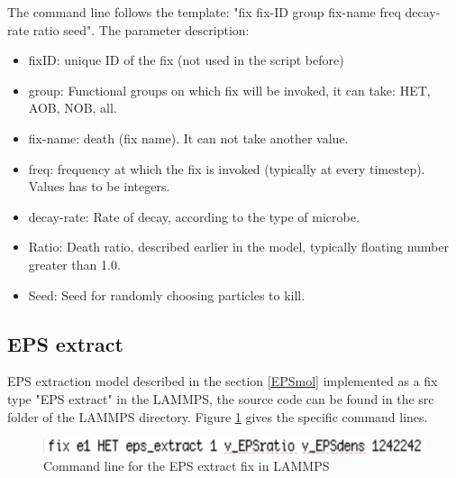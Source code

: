 \documentclass[11pt,a4paper,openright]{article}
\begin{document}
The command line follows the template: "fix fix-ID group fix-name freq decay-rate ratio seed". The parameter description:
\begin{itemize}
\item fixID: unique ID of the fix (not used in the script before)
\item group: Functional groups on which fix will be invoked, it can take: HET, AOB, NOB, all.
\item fix-name: death (fix name). It can not take another value.
\item freq: frequency at which the fix is invoked (typically at every timestep). Values has to be integers.
\item decay-rate: Rate of decay, according to the type of microbe.
\item Ratio: Death ratio, described earlier in the model, typically floating number greater than 1.0.
\item Seed: Seed for randomly choosing particles to kill. 
\end{itemize}

\subsection{EPS extract}
EPS extraction model described in the section \ref{EPSmol} implemented as a fix type "EPS extract" in the LAMMPS, the source code can be found in the src folder of the LAMMPS directory. Figure \ref{fig:EPS} gives the specific command lines.

\begin{figure}[H]
\begin{center}
  \includegraphics[width=0.6\columnwidth]{Figs/EPSfix.pdf}
\caption{Command line for the EPS extract fix in LAMMPS}
\label{fig:EPS}       %
\end{center}
\end{figure}
\end{document}
